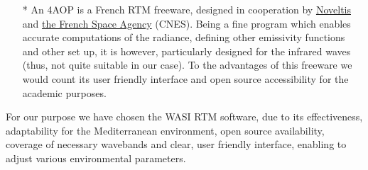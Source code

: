 \documentclass[11pt]{article}
\begin{document}
\begin{itemize}
		\item [*] An \ac{4AOP} is a French RTM freeware, designed in cooperation by \href{http://www.noveltis.fr/fr/index.php}{Noveltis} and \href{http://www.cnes.fr/}{the French Space Agency} (\ac{CNES}). Being a fine program which enables accurate computations of the radiance, defining other emissivity functions and other set up, it is however, particularly designed for the infrared waves (thus, not quite suitable in our case). To the advantages of this freeware we would count its user friendly interface and open source accessibility for the academic purposes. 
	\end{itemize}
For our purpose we have chosen the \ac{WASI} \ac{RTM} software, due to its effectiveness, adaptability for the Mediterranean environment, open source availability, coverage of necessary wavebands and clear, user friendly interface, enabling to adjust various environmental parameters.
\end{document}
